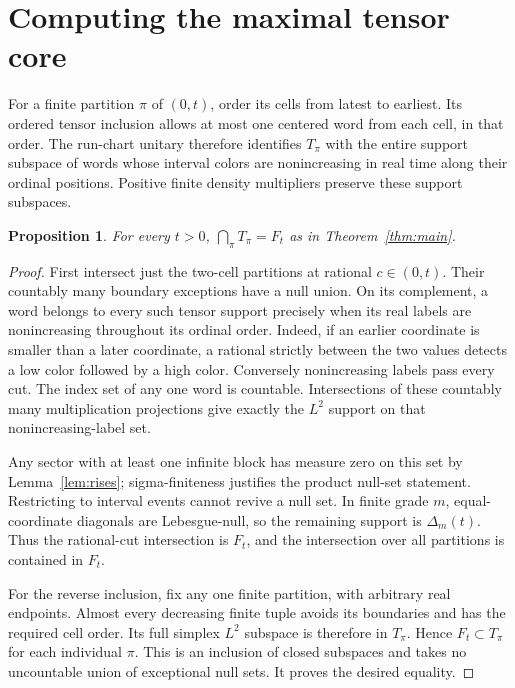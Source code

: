 \documentclass[11pt]{article}
\newtheorem{proposition}[theorem]{Proposition}
\theoremstyle{remark}\newtheorem{remark}[theorem]{Remark}
\begin{document}
\section{Computing the maximal tensor core}\label{sec:core}

For a finite partition $\pi$ of $(0,t)$, order its cells from latest to
earliest. Its ordered tensor inclusion allows at most one centered word from
each cell, in that order. The run-chart unitary therefore identifies $T_\pi$
with the entire support subspace of words whose interval colors are
nonincreasing in real time along their ordinal positions. Positive finite
density multipliers preserve these support subspaces.

\begin{proposition}\label{prop:intersection}
For every $t>0$, $\bigcap_\pi T_\pi=F_t$ as in Theorem~\ref{thm:main}.
\end{proposition}

\begin{proof}
First intersect just the two-cell partitions at rational $c\in(0,t)$.
Their countably many boundary exceptions have a null union. On its complement,
a word belongs to every such tensor support precisely when its real labels are
nonincreasing throughout its ordinal order. Indeed, if an earlier coordinate
is smaller than a later coordinate, a rational strictly between the two values
detects a low color followed by a high color. Conversely nonincreasing labels
pass every cut. The index set of any one word is countable. Intersections of
these countably many multiplication projections give exactly the $L^2$ support
on that nonincreasing-label set.

Any sector with at least one infinite block has measure zero on this set by
Lemma~\ref{lem:rises}; sigma-finiteness justifies the product null-set
statement. Restricting to interval events cannot revive a null set. In finite
grade $m$, equal-coordinate diagonals are Lebesgue-null, so the remaining
support is $\Delta_m(t)$. Thus the rational-cut intersection is $F_t$, and
the intersection over all partitions is contained in $F_t$.

For the reverse inclusion, fix any one finite partition, with arbitrary real
endpoints. Almost every decreasing finite tuple avoids its boundaries and
has the required cell order. Its full simplex $L^2$ subspace is therefore in
$T_\pi$. Hence $F_t\subset T_\pi$ for each individual $\pi$. This is an
inclusion of closed subspaces and takes no uncountable union of exceptional
null sets. It proves the desired equality.
\end{proof}
\end{document}
